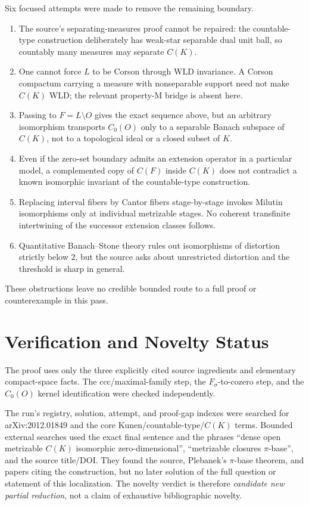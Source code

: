 \documentclass[11pt]{article}
\begin{document}
Six focused attempts were made to remove the remaining boundary.
\begin{enumerate}
\item The source's separating-measures proof cannot be repaired: the
countable-type construction deliberately has weak-star separable dual unit
ball, so countably many measures may separate $C(K)$.
\item One cannot force $L$ to be Corson through WLD invariance.  A Corson
compactum carrying a measure with nonseparable support need not make
$C(K)$ WLD; the relevant property-M bridge is absent here.
\item Passing to $F=L\setminus O$ gives the exact sequence above, but an
arbitrary isomorphism transports $C_0(O)$ only to a separable Banach
subspace of $C(K)$, not to a topological ideal or a closed subset of $K$.
\item Even if the zero-set boundary admits an extension operator in a
particular model, a complemented copy of $C(F)$ inside $C(K)$ does not
contradict a known isomorphic invariant of the countable-type construction.
\item Replacing interval fibers by Cantor fibers stage-by-stage invokes
Milutin isomorphisms only at individual metrizable stages.  No coherent
transfinite intertwining of the successor extension classes follows.
\item Quantitative Banach--Stone theory rules out isomorphisms of distortion
strictly below $2$, but the source asks about unrestricted distortion and
the threshold is sharp in general.
\end{enumerate}
These obstructions leave no credible bounded route to a full proof or
counterexample in this pass.

\section*{Verification and Novelty Status}

The proof uses only the three explicitly cited source ingredients and
elementary compact-space facts.  The ccc/maximal-family step, the
$F_\sigma$-to-cozero step, and the $C_0(O)$ kernel identification were
checked independently.

The run's registry, solution, attempt, and proof-gap indexes were searched
for arXiv:2012.01849 and the core Kunen/countable-type/$C(K)$ terms.  Bounded
external searches used the exact final sentence and the phrases ``dense
open metrizable $C(K)$ isomorphic zero-dimensional'', ``metrizable
closures $\pi$-base'', and the source title/DOI.  They found the source,
Plebanek's $\pi$-base theorem, and papers citing the construction, but no
later solution of the full question or statement of this localization.
The novelty verdict is therefore \emph{candidate new partial reduction},
not a claim of exhaustive bibliographic novelty.
\end{document}
